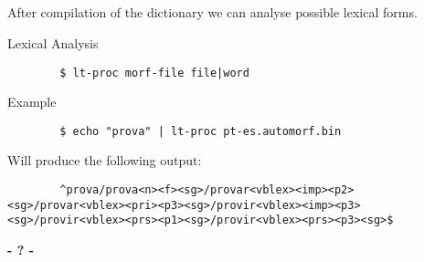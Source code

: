 \documentclass{beamer}
\begin{document}
\subsection{}
\begin{frame}[fragile]
	After compilation of the dictionary we can analyse possible lexical forms.
	\begin{block}{Lexical Analysis}
	
	\lstset{
		    		language=bash,
		    		basicstyle=\ttfamily\small,
		    		breaklines=true
				}
	\begin{lstlisting}
		$ lt-proc morf-file file|word
	\end{lstlisting}
	\end{block}
	\begin{block}{Example}
	
	\lstset{
		    		language=bash,
		    		basicstyle=\ttfamily\small,
		    		breaklines=true
				}
	\begin{lstlisting}
		$ echo "prova" | lt-proc pt-es.automorf.bin
	\end{lstlisting}
	Will produce the following output:
	\lstset{
		    		language=xml,
		    		basicstyle=\ttfamily\small,
		    		breaklines=true
				}
	\begin{lstlisting}
		^prova/prova<n><f><sg>/provar<vblex><imp><p2><sg>/provar<vblex><pri><p3><sg>/provir<vblex><imp><p3><sg>/provir<vblex><prs><p1><sg>/provir<vblex><prs><p3><sg>$
	\end{lstlisting}
	\end{block}
\end{frame}

\begin{frame}
\titlepage
	\begin{center}
		\Huge\bfseries
		- ? -
	\end{center}
\end{frame}
\end{document}
